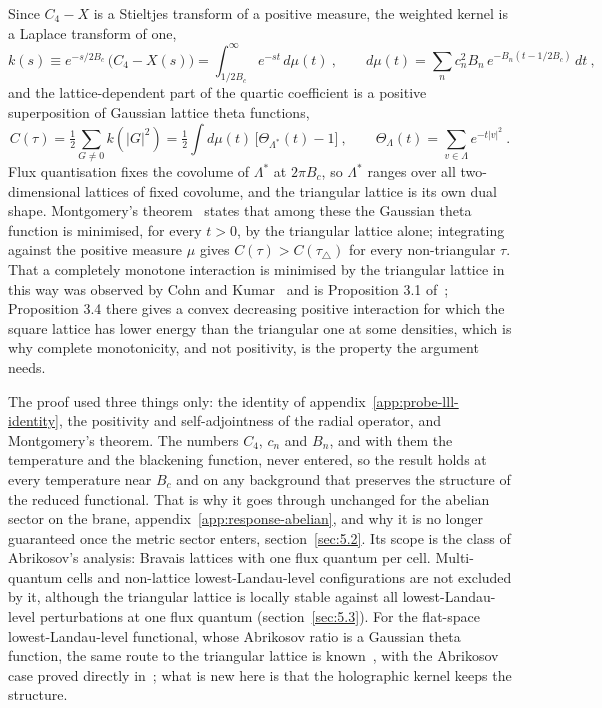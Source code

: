 Since $C_4 - X$ is a Stieltjes transform of a positive
measure, the weighted kernel is a Laplace transform of one,
\begin{equation}
k(s) \equiv e^{-s/2B_c}\,\big(C_4 - X(s)\big) = \int_{1/2B_c}^\infty e^{-st}\,d\mu(t)~, \qquad
d\mu(t) = \sum_n c_n^2B_n\,e^{-B_n(t - 1/2B_c)}\,dt~,
\end{equation}
and the lattice-dependent part of the quartic coefficient is a positive
superposition of Gaussian lattice theta functions,
\begin{equation}
C(\tau) = \tfrac12\sum_{G\neq0}k(|G|^2) = \tfrac12\int d\mu(t)\,\big[\Theta_{\Lambda^*}(t) - 1\big]~, \qquad
\Theta_\Lambda(t) = \sum_{v\in\Lambda}e^{-t|v|^2}~.
\end{equation}
Flux quantisation fixes the covolume of $\Lambda^*$ at $2\pi B_c$, so
$\Lambda^*$ ranges over all two-dimensional lattices of fixed covolume, and
the triangular lattice is its own dual shape. Montgomery's
theorem~\cite{Montgomery:1988mt} states that among these the Gaussian theta
function is minimised, for every $t > 0$, by the triangular lattice alone;
integrating against the positive measure $\mu$ gives
$C(\tau) > C(\tau_\triangle)$ for every non-triangular $\tau$. That a
completely monotone interaction is minimised by the triangular lattice in
this way was observed by Cohn and Kumar~\cite{Cohn:2007universally} and
is Proposition 3.1 of~\cite{Betermin:2016theta}; Proposition 3.4 there
gives a convex decreasing positive interaction for which the square lattice
has lower energy than the triangular one at some densities, which is why complete monotonicity, and not
positivity, is the property the argument needs.

The proof used three things only: the identity of appendix~\ref{app:probe-lll-identity}, the positivity and
self-adjointness of the radial operator, and Montgomery's theorem. The
numbers $C_4$, $c_n$ and $B_n$, and with them the temperature and the
blackening function, never entered, so the result holds at every
temperature near $B_c$ and on any background that preserves the structure
of the reduced functional. That is why it goes through unchanged for the
abelian sector on the brane, appendix~\ref{app:response-abelian}, and why it is no longer
guaranteed once the metric sector enters, section~\ref{sec:5.2}. Its scope is the class of
Abrikosov's analysis: Bravais lattices with one flux quantum per cell.
Multi-quantum cells and non-lattice lowest-Landau-level configurations are
not excluded by it, although the triangular lattice is locally stable
against all lowest-Landau-level perturbations at one flux quantum
(section~\ref{sec:5.3}). For the flat-space lowest-Landau-level functional,
whose Abrikosov ratio is a Gaussian theta function, the same route to the
triangular lattice is known~\cite{Nier:2007theta,Aftalion:2006lll}, with
the Abrikosov case proved directly in~\cite{Nonnenmacher:1998chaotic};
what is new here is that the holographic kernel keeps the structure.

